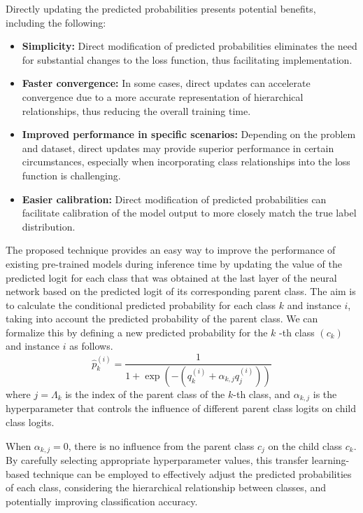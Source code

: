 Directly updating the predicted probabilities presents potential benefits, including the following:
\begin{itemize}
    \item  \textbf{Simplicity:} Direct modification of predicted probabilities eliminates the need for substantial changes to the loss function, thus facilitating implementation.
    \item  \textbf{Faster convergence:} In some cases, direct updates can accelerate convergence due to a more accurate representation of hierarchical relationships, thus reducing the overall training time.
    \item  \textbf{Improved performance in specific scenarios:} Depending on the problem and dataset, direct updates may provide superior performance in certain circumstances, especially when incorporating class relationships into the loss function is challenging.
    \item  \textbf{Easier calibration:} Direct modification of predicted probabilities can facilitate calibration of the model output to more closely match the true label distribution.
\end{itemize}

The proposed technique provides an easy way to improve the performance of existing pre-trained models during inference time by updating the value of the predicted logit for each class that was obtained at the last layer of the neural network based on the predicted logit of its corresponding parent class. The aim is to calculate the conditional predicted probability for each class $k $ and instance $i $, taking into account the predicted probability of the parent class. We can formalize this by defining a new predicted probability for the $k $ -th class $(c_k) $ and instance $i $ as follows.
\begin{equation}
    \widehat{p}_k^{(i)} = \frac{1}{ 1 + \exp \left(-\left(q_k^{(i)} + \alpha_{k,j} q_j^{(i)} \right)\right) }
    \label{eq:taxonomy.eq.1.pred.approach1}
\end{equation}
where $j=\Lambda_k$ is the index of the parent class of the $k$-th class, and $\alpha_{k,j} $ is the hyperparameter that controls the influence of different parent class logits on child class logits. 

When $\alpha_{k,j}=0 $, there is no influence from the parent class $c_j$ on the child class $c_k$.  By carefully selecting appropriate hyperparameter values, this transfer learning-based technique can be employed to effectively adjust the predicted probabilities of each class, considering the hierarchical relationship between classes, and potentially improving classification accuracy.

